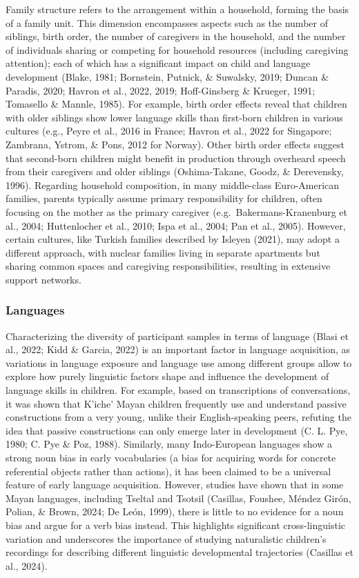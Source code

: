 \documentclass[
  man,floatsintext]{apa6}
\begin{document}
Family structure refers to the arrangement within a household, forming the basis of a family unit. This dimension encompasses aspects such as the number of siblings, birth order, the number of caregivers in the household, and the number of individuals sharing or competing for household resources (including caregiving attention); each of which has a significant impact on child and language development (Blake, 1981; Bornstein, Putnick, \& Suwalsky, 2019; Duncan \& Paradis, 2020; Havron et al., 2022, 2019; Hoff-Ginsberg \& Krueger, 1991; Tomasello \& Mannle, 1985). For example, birth order effects reveal that children with older siblings show lower language skills than first-born children in various cultures (e.g., Peyre et al., 2016 in France; Havron et al., 2022 for Singapore; Zambrana, Ystrom, \& Pons, 2012 for Norway). Other birth order effects suggest that second-born children might benefit in production through overheard speech from their caregivers and older siblings (Oshima-Takane, Goodz, \& Derevensky, 1996).
Regarding household composition, in many middle-class Euro-American families, parents typically assume primary responsibility for children, often focusing on the mother as the primary caregiver (e.g.~Bakermans-Kranenburg et al., 2004; Huttenlocher et al., 2010; Ispa et al., 2004; Pan et al., 2005). However, certain cultures, like Turkish families described by Isleyen (2021), may adopt a different approach, with nuclear families living in separate apartments but sharing common spaces and caregiving responsibilities, resulting in extensive support networks.

\hypertarget{languages}{%
\subsubsection{Languages}\label{languages}}

Characterizing the diversity of participant samples in terms of language (Blasi et al., 2022; Kidd \& Garcia, 2022) is an important factor in language acquisition, as variations in language exposure and language use among different groups allow to explore how purely linguistic factors shape and influence the development of language skills in children. For example, based on transcriptions of conversations, it was shown that K'iche' Mayan children frequently use and understand passive constructions from a very young, unlike their English-speaking peers, refuting the idea that passive constructions can only emerge later in development (C. L. Pye, 1980; C. Pye \& Poz, 1988).
Similarly, many Indo-European languages show a strong noun bias in early vocabularies (a bias for acquiring words for concrete referential objects rather than actions), it has been claimed to be a universal feature of early language acquisition. However, studies have shown that in some Mayan languages, including Tseltal and Tsotsil (Casillas, Foushee, Méndez Girón, Polian, \& Brown, 2024; De León, 1999), there is little to no evidence for a noun bias and argue for a verb bias instead. This highlights significant cross-linguistic variation and underscores the importance of studying naturalistic children's recordings for describing different linguistic developmental trajectories (Casillas et al., 2024).
\end{document}
